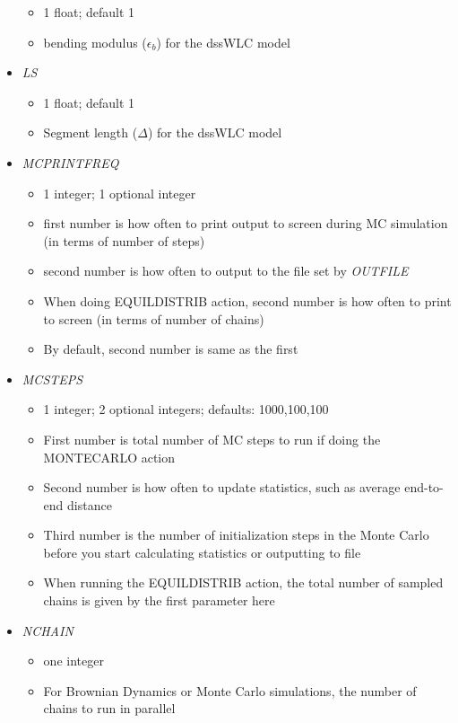 \documentclass[12pt]{article}
\begin{document}
\begin{itemize}
  \begin{itemize}
    \item 1 float; default 1
    \item bending modulus ($\epsilon_b$) for the dssWLC model
  \end{itemize}
%
\item {\it LS}
  \begin{itemize}
    \item 1 float; default 1
    \item Segment length ($\Delta$) for the dssWLC model
  \end{itemize}
%
\item {\it MCPRINTFREQ}
  \begin{itemize}
    \item 1 integer; 1 optional integer
    \item first number is how often to print output to screen during MC simulation (in terms of number of steps)
    \item second number is how often to output to the file set by {\em OUTFILE}
    \item When doing EQUILDISTRIB action, second number is how often to print to screen (in terms of number of chains)
    \item By default, second number is same as the first
  \end{itemize}
%
\item {\it MCSTEPS}
  \begin{itemize}
    \item 1 integer; 2 optional integers; defaults: 1000,100,100
    \item First number is total number of MC steps to run if doing the MONTECARLO action
    \item Second number is how often to update statistics, such as average end-to-end distance
    \item Third number is the number of initialization steps in the Monte Carlo before you start calculating statistics or outputting to file
    \item When running the EQUILDISTRIB action, the total number of sampled chains is given by the first parameter here
  \end{itemize}
%
\item {\it NCHAIN}
  \begin{itemize}
    \item one integer
    \item For Brownian Dynamics or Monte Carlo simulations, the number of chains to run in parallel 

\end{itemize}
\end{itemize}
\end{document}
